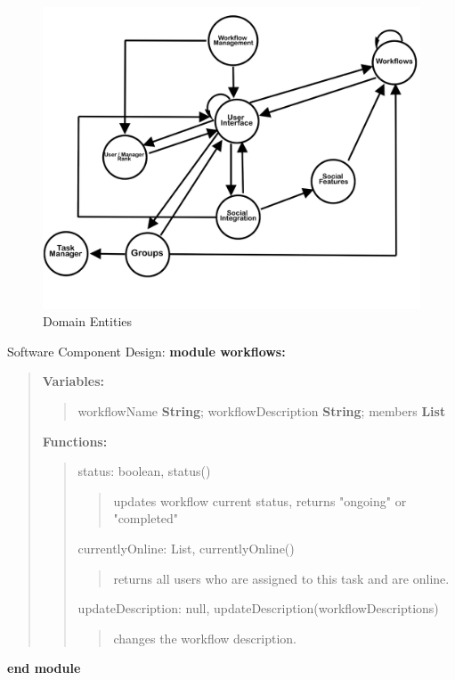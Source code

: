 \documentclass{article}
\begin{document}
\bigbreak
\begin{figure}[ht!]
    \centering
    \includegraphics[width=0.5\columnwidth]{Images/state-view.pdf}
    \caption{Domain Entities}
    \label{fig:figure2}
\end{figure}
\bigbreak
Software Component Design:
\bigbreak
\noindent \textbf{module workflows:}
\begin{quote}
  \textbf{Variables:}
  \begin{quote}
    workflowName \textbf{String}; workflowDescription \textbf{String}; members \textbf{List}
  \end{quote}
  \textbf{Functions:}
  \begin{quote}

    status: boolean, status()
    \begin{quote}
      updates workflow current status, returns "ongoing" or "completed"
    \end{quote}

    currentlyOnline: List, currentlyOnline()
    \begin{quote}
      returns all users who are assigned to this task and are online.
    \end{quote}

    updateDescription: null, updateDescription(workflowDescriptions)
    \begin{quote}
     changes the workflow description.
    \end{quote}
  \end{quote}
\end{quote}
\textbf{end module}
\bigbreak
\end{document}

